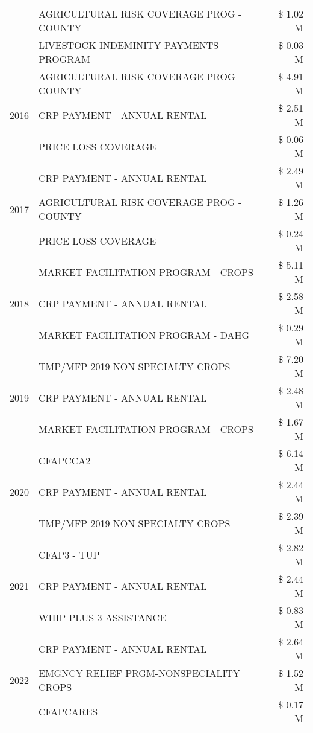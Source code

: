 \begin{tabular}{llr}
 & AGRICULTURAL RISK COVERAGE PROG - COUNTY & \$ 1.02 M \\
 & LIVESTOCK INDEMINITY PAYMENTS PROGRAM & \$ 0.03 M \\
\cline{1-3}
\multirow[t]{3}{*}{2016} & AGRICULTURAL RISK COVERAGE PROG - COUNTY & \$ 4.91 M \\
 & CRP PAYMENT - ANNUAL RENTAL & \$ 2.51 M \\
 & PRICE LOSS COVERAGE & \$ 0.06 M \\
\cline{1-3}
\multirow[t]{3}{*}{2017} & CRP PAYMENT - ANNUAL RENTAL & \$ 2.49 M \\
 & AGRICULTURAL RISK COVERAGE PROG - COUNTY & \$ 1.26 M \\
 & PRICE LOSS COVERAGE & \$ 0.24 M \\
\cline{1-3}
\multirow[t]{3}{*}{2018} & MARKET FACILITATION PROGRAM - CROPS & \$ 5.11 M \\
 & CRP PAYMENT - ANNUAL RENTAL & \$ 2.58 M \\
 & MARKET FACILITATION PROGRAM - DAHG & \$ 0.29 M \\
\cline{1-3}
\multirow[t]{3}{*}{2019} & TMP/MFP 2019 NON SPECIALTY CROPS & \$ 7.20 M \\
 & CRP PAYMENT - ANNUAL RENTAL & \$ 2.48 M \\
 & MARKET FACILITATION PROGRAM - CROPS & \$ 1.67 M \\
\cline{1-3}
\multirow[t]{3}{*}{2020} & CFAPCCA2 & \$ 6.14 M \\
 & CRP PAYMENT - ANNUAL RENTAL & \$ 2.44 M \\
 & TMP/MFP 2019 NON SPECIALTY CROPS & \$ 2.39 M \\
\cline{1-3}
\multirow[t]{3}{*}{2021} & CFAP3 - TUP & \$ 2.82 M \\
 & CRP PAYMENT - ANNUAL RENTAL & \$ 2.44 M \\
 & WHIP PLUS 3 ASSISTANCE & \$ 0.83 M \\
\cline{1-3}
\multirow[t]{3}{*}{2022} & CRP PAYMENT - ANNUAL RENTAL & \$ 2.64 M \\
 & EMGNCY RELIEF PRGM-NONSPECIALITY CROPS & \$ 1.52 M \\
 & CFAPCARES & \$ 0.17 M \\
\cline{1-3}
\bottomrule
\end{tabular}
